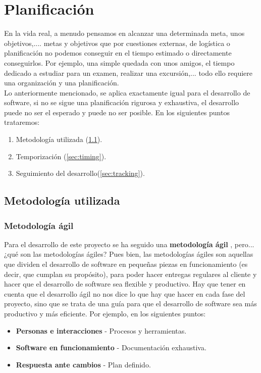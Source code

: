 \chapter{Planificación}
En la vida real, a menudo pensamos en alcanzar una determinada meta, unos objetivos,....
metas y objetivos que por cuestiones externas, de logística o planificación no podemos
conseguir en el tiempo estimado o directamente conseguirlos. Por ejemplo, una simple
quedada con unos amigos, el tiempo dedicado a estudiar para un examen, realizar una
excursión,... todo ello requiere una organización y una planificación.\\

Lo anteriormente mencionado, se aplica exactamente igual para el desarrollo de software,
si no se sigue una planificación rigurosa y exhaustiva, el desarrollo puede no ser el
esperado y puede no ser posible. En los siguientes puntos trataremos:

    \begin{enumerate}
        \item Metodología utilizada (\ref{sec:methodology}).
        \item Temporización (\ref{sec:timing}).
        \item Seguimiento del desarrollo(\ref{sec:tracking}).
    \end{enumerate}

\section{Metodología utilizada} \label{sec:methodology}
\subsection{Metodología ágil}
Para el desarrollo de este proyecto se ha seguido una \textbf{metodología ágil}
\cite{agile-methodology}, pero...¿qué son las metodologías ágiles? Pues bien, las
metodologías ágiles son aquellas que dividen el desarrollo de software en pequeñas piezas
en funcionamiento (es decir, que cumplan su propósito), para poder hacer entregas regulares
al cliente y hacer que el desarrollo de software sea flexible y productivo. Hay que tener
en cuenta que el desarrollo ágil no nos dice lo que hay que hacer en cada fase del
proyecto, sino que se trata de una guía para que el desarrollo de software sea más
productivo y más eficiente. Por ejemplo, en los siguientes puntos:

    \begin{itemize}
        \item \textbf{Personas e interacciones} - Procesos y herramientas.
        \item \textbf{Software en funcionamiento} - Documentación exhaustiva.
        \item \textbf{Respuesta ante cambios} - Plan definido.
    \end{itemize}

